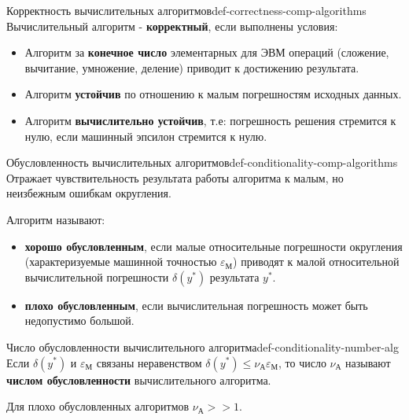 \documentclass[14pt]{extarticle}
\begin{document}
    \begin{definition}{Корректность вычислительных алгоритмов}{def-correctness-comp-algorithms}
        Вычислительный алгоритм - \textbf{корректный}, если выполнены условия:
        \begin{itemize}
            \item Алгоритм за \textbf{конечное число} элементарных для ЭВМ операций (сложение, вычитание, умножение, деление) приводит к достижению результата.
            \item Алгоритм \textbf{устойчив} по отношению к малым погрешностям исходных данных.
            \item Алгоритм \textbf{вычислительно устойчив}, т.е: погрешность решения стремится к нулю, если машинный эпсилон стремится к нулю.
        \end{itemize}
    \end{definition}

    \begin{definition}{Обусловленность вычислительных алгоритмов}{def-conditionality-comp-algorithms}
        Отражает чувствительность результата работы алгоритма к малым, но неизбежным ошибкам округления.
   
        Алгоритм называют:
        \begin{itemize}
            \item \textbf{хорошо обусловленным}, если малые относительные погрешности округления (характеризуемые машинной точностью $\varepsilon_{\text{М}}$) приводят к малой относительной вычислительной погрешности $\delta(y^{*})$ результата $y^{*}$.
            \item \textbf{плохо обусловленным}, если вычислительная погрешность может быть недопустимо большой.
        \end{itemize}
   
    \end{definition}

    \begin{definition}{Число обусловленности вычислительного алгоритма}{def-conditionality-number-alg}
        Если $\delta(y^{*})$ и $\varepsilon_{\text{М}}$ связаны неравенством $\delta(y^{*}) \leq \nu_{\text{А}}\varepsilon_{\text{М}}$, то число $\nu_{\text{А}}$ называют \textbf{числом обусловленности} вычислительного алгоритма.\\
    \end{definition}

    Для плохо обусловленных алгоритмов $\nu_{\text{А}} >> 1$.
\end{document}
